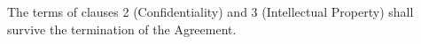 \documentclass[nz-terms]{subfiles}
\begin{document}
The terms of clauses 2 (Confidentiality) and 3 (Intellectual Property) shall
survive the termination of the Agreement.
\end{document}
